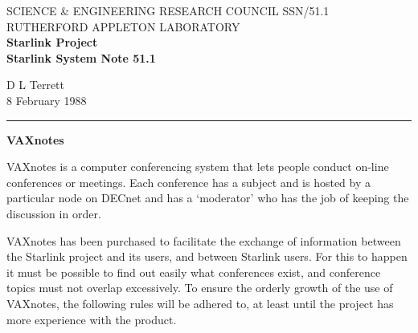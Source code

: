 \pagestyle{myheadings}
\setlength{\textwidth}{160mm}
\setlength{\textheight}{240mm}
\setlength{\topmargin}{-5mm}
\setlength{\oddsidemargin}{0mm}
\setlength{\evensidemargin}{0mm}
\setlength{\parindent}{0mm}
\setlength{\parskip}{\medskipamount}
\setlength{\unitlength}{1mm}


\thispagestyle{empty}
SCIENCE \& ENGINEERING RESEARCH COUNCIL \hfill SSN/51.1\\
RUTHERFORD APPLETON LABORATORY\\
{\large\bf Starlink Project\\}
{\large\bf Starlink System Note 51.1}
\begin{flushright}
D L Terrett\\
8 February 1988
\end{flushright}
\vspace{-4mm}
\rule{\textwidth}{0.5mm}
\vspace{5mm}
\begin{center}
{\Large\bf VAXnotes}
\end{center}
\vspace{5mm}

VAXnotes is a computer conferencing system that lets people conduct on-line
conferences or meetings. Each conference has a subject and is hosted by
a particular node on DECnet and has a `moderator' who has the job of keeping
the discussion in order.

VAXnotes has been purchased to facilitate the exchange of information between
the Starlink project and its users, and between Starlink users. For this to
happen it must be possible to find out easily what conferences exist, and
conference topics must not overlap excessively. To ensure the orderly growth of
the use of VAXnotes, the following rules will be adhered to, at least until the
project has more experience with the product.

